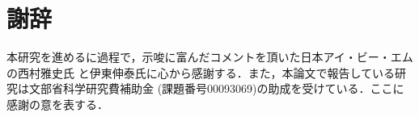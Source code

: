 \section*{謝辞}

本研究を進めるに過程で，示唆に富んだコメントを頂いた日本アイ・ビー・エムの西村雅史氏
と伊東伸泰氏に心から感謝する．また，本論文で報告している研究は文部省科学研究費補助金
(課題番号00093069)の助成を受けている．ここに感謝の意を表する．














